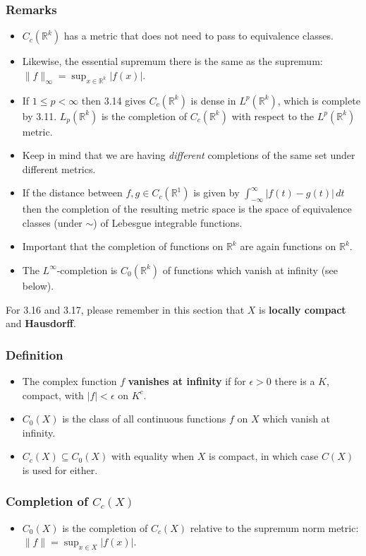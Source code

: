 \documentclass{article}
\newcounter{topicnumber}[section]
\newcommand{\steptopic}[1][1]{\addtocounter{topicnumber}{#1}}
\newenvironment{topic}[1]{%
\steptopic%
\subsubsection{#1}%
\begin{itemize}%
}{%
\end{itemize}%
}
\newcommand{\term}[1]{{\bf #1}}
\newcommand{\remark}{\item}
\newcommand{\note}{\item[{\em Note:}]}
\begin{document}
\begin{topic}{Remarks}
\remark $C_c(\mathbb{R}^k)$ has a metric that does not need to pass to equivalence classes.
\remark Likewise, the essential supremum there is the same as the supremum: $\|f\|_\infty = \sup_{x \in \mathbb{R}^k} |f(x)|$.
\remark If $1 \leq p < \infty$ then 3.14 gives $C_c(\mathbb{R}^k)$ is dense in $L^p(\mathbb{R}^k)$, which is complete by 3.11. $L_p(\mathbb{R}^k)$ is the completion of $C_c(\mathbb{R}^k)$ with respect to the $L^p(\mathbb{R}^k)$ metric.
\note Keep in mind that we are having {\em different} completions of the same set under different metrics.
\remark If the distance between $f, g \in C_c(\mathbb{R}^1)$ is given by $\int_{-\infty}^\infty |f(t) - g(t)|\,dt$ then the completion of the resulting metric space is the space of equivalence classes (under $\sim$) of Lebesgue integrable functions.
\note Important that the completion of functions on $\mathbb{R}^k$ are again functions on $\mathbb{R}^k$.
\remark The $L^\infty$-completion is $C_0(\mathbb{R}^k)$ of functions which vanish at infinity (see below).
\end{topic}

 For 3.16 and 3.17, please remember in this section that $X$ is {\bf locally compact} and {\bf Hausdorff}.

\begin{topic}{Definition}
\remark The complex function $f$ \term{vanishes at infinity} if for $\epsilon > 0$ there is a $K$, compact, with $|f| < \epsilon$ on $K^c$.
\remark $C_0(X)$ is the class of all continuous functions $f$ on $X$ which vanish at infinity.
\remark $C_c(X) \subseteq C_0(X)$ with equality when $X$ is compact, in which case $C(X)$ is used for either.
\end{topic}

\begin{topic}{Completion of $C_c(X)$}
\remark $C_0(X)$ is the completion of $C_c(X)$ relative to the supremum norm metric: $\|f\| = \sup_{x \in X} |f(x)|$.
\end{topic}
\end{document}
